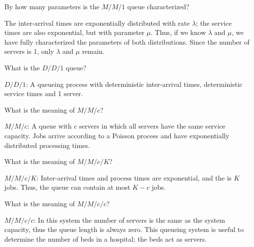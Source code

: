 \begin{exercise}[\faFlask]
  By how many parameters is the $M/M/1$ queue characterized?
  \begin{solution}
    The inter-arrival times are exponentially distributed with rate $\lambda$; the service times are also exponential, but with parameter $\mu$. Thus, if we know $\lambda$ and $\mu$, we have fully characterized the parameters of both distributions. Since the number of servers is 1, only $\lambda$ and $\mu$ remain.
  \end{solution}
\end{exercise}

\begin{exercise}[\faPhoto]
What is the $D/D/1$ queue?  
\begin{solution}
$D/D/1$: A queueing process with deterministic inter-arrival times, deterministic service times and 1 server.
\end{solution}
\end{exercise}

\begin{exercise}[\faPhoto]
  What is the meaning of $M/M/c$?
  \begin{solution}
$M/M/c$: A  queue with $c$ servers in which
  all servers have the same service capacity. Jobs arrive according to a
  Poisson process and have exponentially distributed processing times.
  \end{solution}
\end{exercise}

\begin{exercise}[\faPhoto]
  What is the meaning of $M/M/c/K$?
  \begin{solution}
$M/M/c/K$: Inter-arrival times and process times are exponential,
  and the  is $K$ jobs. Thus, the queue can
  contain at most $K-c$ jobs. 

  \end{solution}
\end{exercise}


\begin{exercise}[\faPhoto]
  What is the meaning of $M/M/c/c$?
  \begin{solution}
 $M/M/c/c$: In this system the number of servers is the same as
  the system capacity, thus the queue length is always zero. This
  queueing system is useful to determine the number of beds
  in a hospital; the beds act as servers.
  \end{solution}
\end{exercise}

